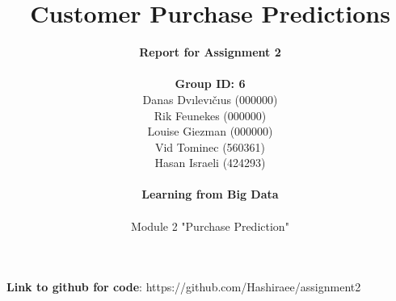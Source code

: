 \documentclass[11pt]{article}
\title{\textbf{Customer Purchase Predictions}}
\author{
    \textbf{Report for Assignment 2} \\
    \\
    \textbf{Group ID: 6} \\
    Danas Dvılevıčıus (000000) \\
    Rik Feunekes (000000) \\
    Louise Giezman (000000) \\
    Vid Tominec (560361) \\
    Hasan Israeli (424293) \\
    \\
    \textbf{Learning from Big Data} \\
    \\
    Module 2 "Purchase Prediction"
}
\begin{document}
\maketitle
\textbf{Link to github for code}: https://github.com/Hashiraee/assignment2
    \newpage
    
    
    
    
    
    
\end{document}
